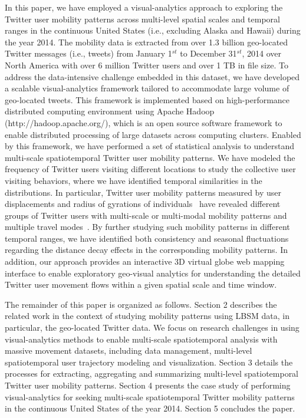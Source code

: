 \documentclass[ijgi,article,accept,moreauthors,pdftex,10pt,a4paper]{mdpi}
\theoremstyle{mdpi}
\newcounter{ex}
\newcounter{re}
\theoremstyle{mdpidefinition}
\begin{document}
In this paper, we have employed a visual-analytics approach to exploring the Twitter user mobility patterns across multi-level spatial scales and temporal ranges in the continuous United States (i.e., excluding Alaska and Hawaii) during the year 2014.
The mobility data is extracted from over 1.3 billion geo-located Twitter messages (i.e., tweets) from January 1$^{st}$ to December 31$^{st}$, 2014 over North America with over 6 million Twitter users and over 1 TB in file size.
To address the data-intensive challenge embedded in this dataset, we have developed a scalable visual-analytics framework tailored to accommodate large volume of geo-located tweets.
This framework is implemented based on high-performance distributed computing environment using Apache Hadoop (http://hadoop.apache.org/), which is an open source software framework to enable distributed processing of large datasets across computing clusters.
Enabled by this framework, we have performed a set of statistical analysis to understand multi-scale spatiotemporal Twitter user mobility patterns. 
We have modeled the frequency of Twitter users visiting different locations to study the collective user visiting behaviors, where we have identified temporal similarities in the distributions.
In particular, Twitter user mobility patterns measured by user displacements and radius of gyrations of individuals~\cite{gonzalez2008understanding} have revealed different groups of Twitter users with multi-scale or multi-modal mobility patterns and multiple travel modes~\cite{Jurdak2015}.
By further studying such mobility patterns in different temporal ranges, we have identified both consistency and seasonal fluctuations regarding the distance decay effects in the corresponding mobility patterns.
In addition, our approach provides an interactive 3D virtual globe web mapping interface to enable exploratory geo-visual analytics for understanding the detailed Twitter user movement flows within a given spatial scale and time window.

The remainder of this paper is organized as follows.
Section 2 describes the related work in the context of studying mobility patterns using LBSM data, in particular, the geo-located Twitter data.
We focus on research challenges in using visual-analytics methods to enable multi-scale spatiotemporal analysis with massive movement datasets, including data management, multi-level spatiotemporal user trajectory modeling and visualization.
Section 3 details the processes for extracting, aggregating and summarizing multi-level spatiotemporal Twitter user mobility patterns.
Section 4 presents the case study of performing visual-analytics for seeking multi-scale spatiotemporal Twitter mobility patterns in the continuous United States of the year 2014.
Section 5 concludes the paper.
\end{document}
